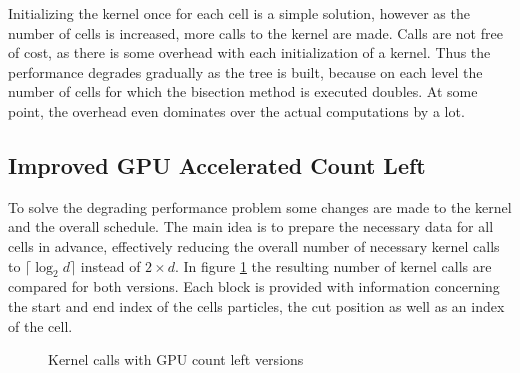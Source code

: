 \documentclass[]{article}
\begin{document}
Initializing the kernel once for each cell is a simple solution, however as the number of cells is increased, more calls to the kernel are made. Calls are not free of cost, as there is some overhead with each initialization of a kernel. Thus the performance degrades gradually as the tree is built, because on each level the number of cells for which the bisection method is executed doubles. At some point, the overhead even dominates over the actual computations by a lot. 


\subsection{Improved GPU Accelerated Count Left} \label{imprctl}

To solve the degrading performance problem some changes are made to the kernel and the overall schedule. The main idea is to prepare the necessary data for all cells in advance, effectively reducing the overall number of necessary kernel calls to $\lceil \log_2 d \rceil $ instead of $2 \times d$. In figure \ref{fig:degrading} the resulting number of kernel calls are compared for both versions. Each block is provided with information concerning the start and end index of the cells particles, the cut position as well as an index of the cell. 


\begin{figure}[H]
	\begin{center}
		\caption{Kernel calls with GPU count left versions}
		\label{fig:degrading}
	\end{center}
\end{figure}
\end{document}
